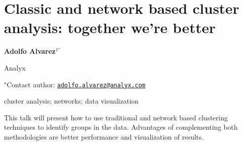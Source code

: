 \documentclass[\main/boa.tex]{subfiles}
\begin{document}
\section{Classic and network based cluster analysis: together we're better}

\begin{center}
  {\bf {} Adolfo Alvarez$^{1^\star}$}
\end{center}

\vskip 0.3cm

\begin{affiliations}
\begin{enumerate}
\begin{minipage}{0.915\textwidth}
\centering
\item Analyx \\[-2pt]
\end{minipage}
\end{enumerate}
$^\star$Contact author: \href{mailto:adolfo.alvarez@analyx.com}{\nolinkurl{adolfo.alvarez@analyx.com}}\\
\end{affiliations}

\vskip 0.5cm

\begin{minipage}{0.915\textwidth}
\keywords cluster analysis; networks; data visualization
\end{minipage}

\vskip 0.8cm

This talk will present how to use traditional and network based clustering techniques to identify groups in the data. Advantages of complementing both methodologies are better performance and visualization of results.
\end{document}
